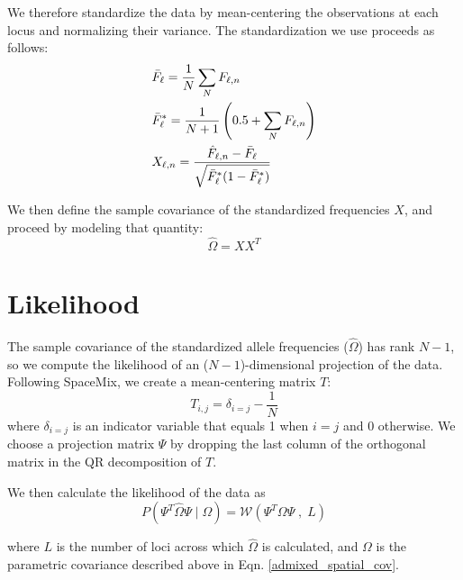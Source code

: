 \documentclass[12pt]{article}
\begin{document}
We therefore standardize the data by mean-centering the observations at each locus and normalizing their variance.
The standardization we use proceeds as follows:
\begin{align}
&\bar{F}_{\ell} = \frac{1}{N}\sum\limits_NF_{\ell,n} \\ \notag
&\bar{F}^{*}_{\ell} = \frac{1}{N+1}\left( 0.5 + \sum\limits_N	F_{\ell,n} \right)   \\ \notag
&X_{\ell,n} = \frac{\hat{F}_{\ell,n} - \bar{F}_{\ell}}{\sqrt{\bar{F}^{*}_{\ell} (1-\bar{F}^{*}_{\ell})}}
\label{std_freqs}
\end{align}

We then define the sample covariance of the standardized frequencies $X$,
and proceed by modeling that quantity:
\begin{equation}
\widehat{\Omega} = XX^T
\label{sample_std_cov}
\end{equation}

\section{Likelihood}
The sample covariance of the standardized allele frequencies ($\widehat{\Omega}$) has rank $N-1$, 
so we compute the likelihood of an ($N-1$)-dimensional projection of the data.
Following SpaceMix, we create a mean-centering matrix $T$: 
\begin{equation}
T_{i,j} = \delta_{i=j} - \frac{1}{N}
\label{mc_matrix}
\end{equation}
where $\delta_{i=j}$ is an indicator variable that equals 1 when $i=j$ and 0 otherwise.
We choose a projection matrix $\Psi$ by dropping the last column 
of the orthogonal matrix in the QR decomposition of $T$.

We then calculate the likelihood of the data as
\begin{equation}
P(\Psi^T\widehat{\Omega}\Psi \; | \; \Omega) = \mathcal{W}(\Psi^T \Omega \Psi \; , \; L)
\label{likelihood}
\end{equation} 

where $L$ is the number of loci across which $\widehat{\Omega}$ is calculated,
and $\Omega$ is the parametric covariance described above in Eqn. \eqref{admixed_spatial_cov}.  
\end{document}
